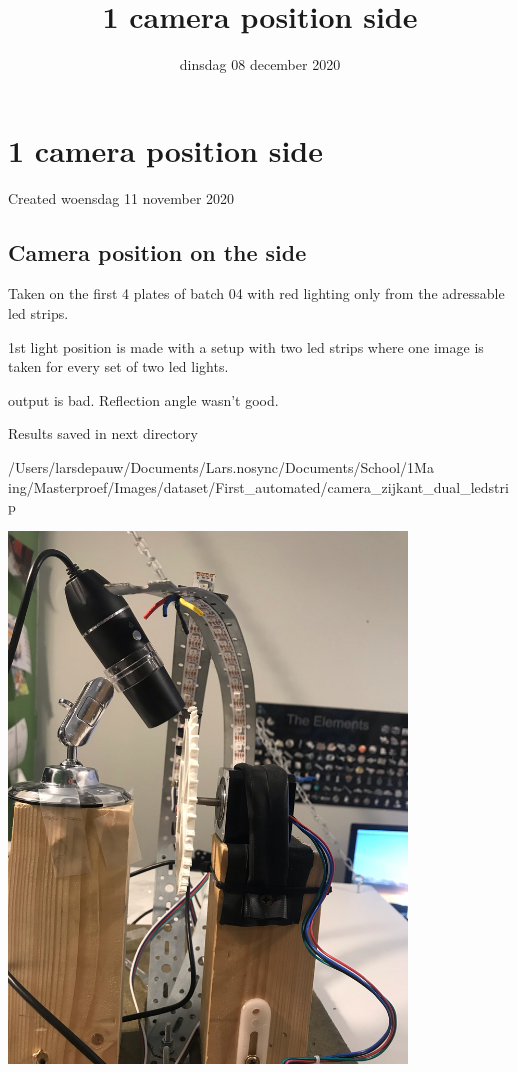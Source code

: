 \documentclass{scrartcl}
\title{1 camera position side}
\date{dinsdag 08 december 2020}
\author{}
\begin{document}
\maketitle

		\section{1 camera position side}

Created woensdag 11 november 2020



\subsection{Camera position on the side}

Taken on the first 4 plates of batch 04 with red lighting only from the adressable led strips. 



1st light position is made with a setup with two led strips where one image is taken for every set of two led lights. 

output is bad. Reflection angle wasn't good. 

Results saved in next directory

/Users/larsdepauw/Documents/Lars.nosync/Documents/School/1Ma ing/Masterproef/Images/dataset/First\_automated/camera\_zijkant\_dual\_ledstrip



\includegraphics[width=4.166667in, keepaspectratio=true]{./1_camera_position_side/achter2.jpeg}
\end{document}
